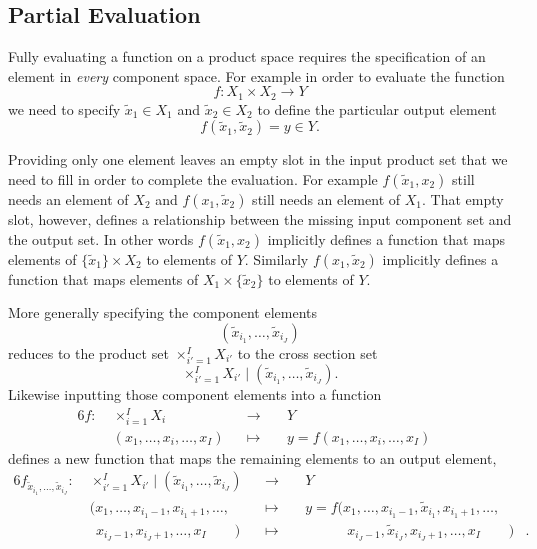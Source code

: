 \documentclass[
  letterpaper,
  DIV=11,
  numbers=noendperiod]{scrartcl}
\begin{document}
\hypertarget{partial-evaluation}{%
\subsection{Partial Evaluation}\label{partial-evaluation}}

Fully evaluating a function on a product space requires the
specification of an element in \emph{every} component space. For example
in order to evaluate the function \[
f: X_{1} \times X_{2} \rightarrow Y
\] we need to specify \(\tilde{x}_{1} \in X_{1}\) and
\(\tilde{x}_{2} \in X_{2}\) to define the particular output element \[
f(\tilde{x}_{1}, \tilde{x}_{2}) = y \in Y.
\]

Providing only one element leaves an empty slot in the input product set
that we need to fill in order to complete the evaluation. For example
\(f(\tilde{x}_{1}, x_{2})\) still needs an element of \(X_{2}\) and
\(f(x_{1}, \tilde{x}_{2})\) still needs an element of \(X_{1}\). That
empty slot, however, defines a relationship between the missing input
component set and the output set. In other words
\(f(\tilde{x}_{1}, x_{2})\) implicitly defines a function that maps
elements of \(\{ \tilde{x}_{1} \} \times X_{2}\) to elements of \(Y\).
Similarly \(f(x_{1}, \tilde{x}_{2})\) implicitly defines a function that
maps elements of \(X_{1} \times \{ \tilde{x}_{2} \}\) to elements of
\(Y\).

More generally specifying the component elements \[
( \tilde{x}_{i_{1}}, \ldots, \tilde{x}_{i_{J}} )
\] reduces to the product set \(\times_{i' = 1}^{I} X_{i'}\) to the
cross section set \[
\times_{i' = 1}^{I} X_{i'} \mid (\tilde{x}_{i_{1}}, \ldots, \tilde{x}_{i_{J}}).
\] Likewise inputting those component elements into a function
\begin{alignat*}{6}
f :\; & \times_{i = 1}^{I} X_{i} & &\rightarrow& \; & Y &
\\
& (x_{1}, \ldots, x_{i}, \ldots, x_{I}) & &\mapsto&
& y = f(x_{1}, \ldots, x_{i}, \ldots, x_{I}) &
\end{alignat*} defines a new function that maps the remaining elements
to an output element, \begin{alignat*}{6}
f_{ \tilde{x}_{i_{1}}, \ldots, \tilde{x}_{i_{J}} } :\; &
\times_{i' = 1}^{I} X_{i'} \mid (\tilde{x}_{i_{1}}, \ldots, \tilde{x}_{i_{J}}) &
&\rightarrow& \; & Y &
\\
& (x_{1}, \ldots, x_{i_{1} - 1}, x_{i_{1} + 1}, \ldots, & &\mapsto&
& y = f(x_{1}, \ldots, x_{i_{1} - 1}, \tilde{x}_{i_{1}}, x_{i_{1} + 1}, \ldots, &
\\
& \;\, x_{i_{J} - 1}, x_{i_{J} + 1}, \ldots, x_{I} \quad\quad) & &\mapsto&
& \quad\quad\quad x_{i_{J} - 1}, \tilde{x}_{i_{J}}, x_{i_{J} + 1}, \ldots, x_{I} \quad\quad) &.
\end{alignat*}
\end{document}
